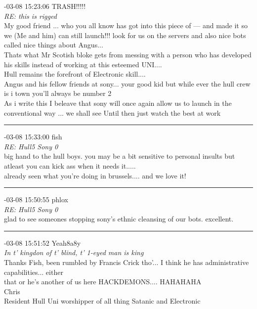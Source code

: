 \begin{mail}
{-03-08 15:23:06 TRASH!!!!!}\\
{\itshape RE: this is rigged}\\
My good friend ... who you all know has got into this piece of --- and made it so we (Me and him) can still launch!!! look for us on the servers and also nice bots called nice things about Angus...\\
Thats what Mr Scotish bloke gets from messing with a person who has developed his skills instead of working at this esteemed UNI....\\
Hull remains the forefront of Electronic skill....\\
Angus and his fellow friends at sony... your good kid but while ever the hull crew is i  town you'll always be number 2\\
As i write this I beleave that sony will once again allow us to launch in the conventional way ... we shall see 
Until then just watch the best at work\\

\rule{0.8\textwidth}{.4pt}

{-03-08 15:33:00 fish}\\
{\itshape RE: Hull5 Sony 0}\\
big hand to the hull boys.
you may be a bit sensitive to personal insults but atleast you can kick ass when it needs it.....\\
already seen what you're doing in brussels.... and we love it!\\

\rule{0.8\textwidth}{.4pt}

{-03-08 15:50:55 phlox}\\
{\itshape RE: Hull5 Sony 0}\\
glad to see someones stopping sony's ethnic cleansing of our bots. excellent.\\

\rule{0.8\textwidth}{.4pt}

{-03-08 15:51:52 Yeah8a8y}\\
{\itshape In t' kingdon of t' blind, t' 1-eyed man is king}\\
Thanks Fish, been rumbled by Francis Crick tho'... I think he has administrative capabilities... either \\
that or he's another of us here HACKDEMONS.... HAHAHAHA\\
Chris\\
Resident Hull Uni worshipper of all thing Satanic and Electronic\\


\end{mail}
